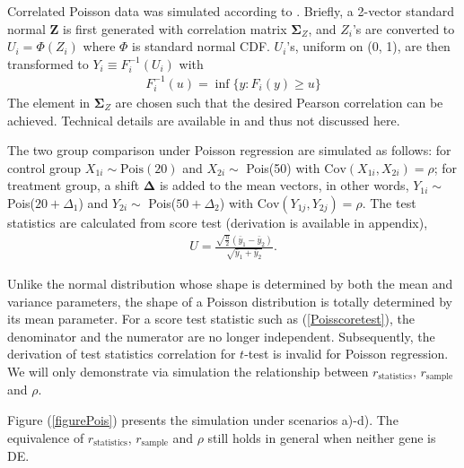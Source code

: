 \documentclass[12pt, a4paper]{article}
\newcommand{\cov}{\text{Cov}}
\begin{document}
	
	
	Correlated Poisson data was simulated according to \cite{madsen2013simulating}. Briefly, a 2-vector
	standard normal $\bm Z$ is first generated with correlation matrix $\bm \Sigma_Z$, and $Z_i$'s are
	converted to $U_i= \Phi(Z_i)$ where $\Phi$ is standard normal CDF. $U_i$'s, uniform on (0, 1), are
	then transformed to $Y_i \equiv F_i^{-1}(U_i)$ with 
	\begin{align}\label{inverseSim}
		F_i^{-1}(u) = \inf \{y: F_i(y)\geq u\}
	\end{align}
	The element in $\bm \Sigma_Z$ are chosen such that the desired Pearson correlation can be achieved.
	Technical details are available in \cite{madsen2013simulating} and thus not discussed here. 
	
	The two group comparison under Poisson regression are simulated as follows: for control group
	$X_{1i} \sim \text{Pois}(20)$ and $X_{2i}\sim $ Pois(50)   with $\cov(X_{1i}, X_{2i}) = \rho$;
	for treatment group, a shift $\bm \Delta$ is added to the mean vectors, in other words, $Y_{1i} \sim
	$ Pois($20 + \Delta_1$) and $Y_{2i} \sim $ Pois($50 + \Delta_2$) with $\cov(Y_{1j}, Y_{2j}) =
	\rho$. The test statistics are calculated from score test (derivation is available in appendix),
	\begin{align}\label{Poisscoretest}
		U = \frac{\sqrt{\frac{n}{2}}(\bar{y}_1- \bar{y}_2)}{\sqrt{\bar{y}_1 + \bar{y}_2}}.
	\end{align}
	
	Unlike the normal distribution whose shape is determined by both the mean and variance parameters,
	the shape of a Poisson distribution is totally determined by its mean parameter. For a score test
	statistic such as (\ref{Poisscoretest}), the denominator and the numerator are no longer
	independent. Subsequently, the derivation of test statistics correlation for $t$-test is invalid for
	Poisson regression. We will only demonstrate via simulation the relationship between 
	$r_\text{statistics}$, $r_{\text{sample}}$ and $\rho$.
	
	Figure (\ref{figurePois}) presents the simulation under scenarios a)-d). The equivalence of
	$r_\text{statistics}$, $r_{\text{sample}}$ and $\rho$ still holds in general when neither gene is
	DE.  
	
\end{document}
